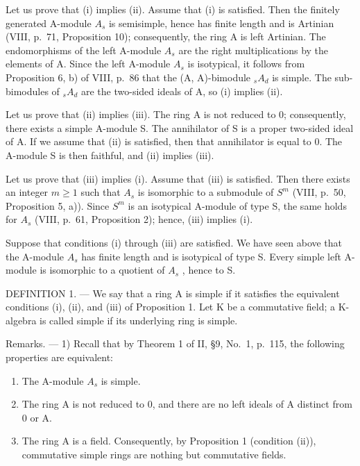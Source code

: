 Let us prove that (i) implies (ii). Assume that (i) is satisfied. Then the finitely generated A-module \(A_{s}\) is semisimple, hence has finite length and is Artinian (VIII, p.~71, Proposition 10); consequently, the ring A is left Artinian. The endomorphisms of the left A-module \(A_{s}\) are the right multiplications by the elements of A. Since the left A-module \(A_{s}\) is isotypical, it follows from Proposition 6, b) of VIII, p.~86 that the (A, A)-bimodule \(_{s}A_{d}\) is simple. The sub-bimodules of \(_{s}A_{d}\) are the two-sided ideals of A, so (i) implies (ii).

Let us prove that (ii) implies (iii). The ring A is not reduced to 0; consequently, there exists a simple A-module S. The annihilator of S is a proper two-sided ideal of A. If we assume that (ii) is satisfied, then that annihilator is equal to 0. The A-module S is then faithful, and (ii) implies (iii).

Let us prove that (iii) implies (i). Assume that (iii) is satisfied. Then there exists an integer \(m \geqslant 1\) such that \(A_{s}\) is isomorphic to a submodule of \(S^{m}\) (VIII, p.~50, Proposition 5, a)). Since \(S^{m}\) is an isotypical A-module of type S, the same holds for \(A_{s}\) (VIII, p.~61, Proposition 2); hence, (iii) implies (i).

Suppose that conditions (i) through (iii) are satisfied. We have seen above that the A-module \(A_{s}\) has finite length and is isotypical of type S. Every simple left A-module is isomorphic to a quotient of \(A_{s}\) , hence to S.

DEFINITION 1. --- We say that a ring A is simple if it satisfies the equivalent conditions (i), (ii), and (iii) of Proposition 1. Let K be a commutative field; a K-algebra is called simple if its underlying ring is simple.

Remarks. --- 1) Recall that by Theorem 1 of II, §9, No.~1, p.~115, the following properties are equivalent:

\begin{enumerate}
\def\labelenumi{(\roman{enumi})}
\item
  The A-module \(A_{s}\) is simple.
\item
  The ring A is not reduced to 0, and there are no left ideals of A distinct from 0 or A.
\item
  The ring A is a field. Consequently, by Proposition 1 (condition (ii)), commutative simple rings are nothing but commutative fields.
\end{enumerate}

